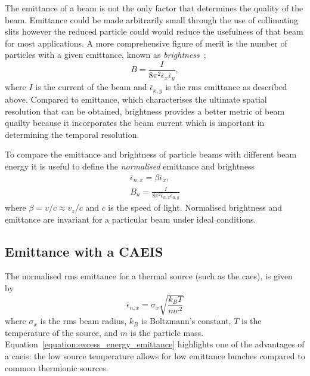 The emittance of a beam is not the only factor that determines the quality of the beam.
Emittance could be made arbitrarily small through the use of collimating slits however the reduced particle could would reduce the usefulness of that beam for most applications.
A more comprehensive figure of merit is the number of particles with a given emittance, known as \emph{brightness}~\cite{reiser_theory_2008};
\begin{equation}
B = \frac{I}{8\pi^2\bar{\epsilon}_x\bar{\epsilon}_y},
\end{equation}
where $I$ is the current of the beam and $\bar{\epsilon}_{x,y}$ is the \gls{rms} emittance as described above.
Compared to emittance, which characterises the ultimate spatial resolution that can be obtained, brightness provides a better metric of beam quailty because it incorporates the beam current which is important in determining the temporal resolution.

To compare the emittance and brightness of particle beams with different beam energy it is useful to define the \emph{normalised} emittance and brightness
\begin{align}
\bar{\epsilon}_{n,x} = \beta\bar{\epsilon}_x,\\
B_n = \frac{I}{8\pi^2\bar{\epsilon}_{n,x}\bar{\epsilon}_{n,y}}
\end{align}
where $\beta=v/c\approx v_z/c$ and $c$ is the speed of light.
Normalised brightness and emittance are invariant for a particular beam under ideal conditions.


\subsection{Emittance with a CAEIS}
\label{section:excess_energy_emittance}

The normalised \gls{rms} emittance for a thermal source (such as the \gls{caes}), is given by~\cite{mcculloch_high-coherence_2013}
\begin{equation}\label{equation:excess_energy_emittance}
\bar{\epsilon}_{n,x} = \sigma_x \sqrt{\frac{k_B T}{m c^2}}
\end{equation}
where $\sigma_x$ is the \gls{rms} beam radius, $k_B$ is Boltzmann's constant, $T$ is the temperature of the source, and $m$ is the particle mass.
Equation~\ref{equation:excess_energy_emittance} highlights one of the advantages of a \gls{caeis}: the low source temperature allows for low emittance bunches compared to common thermionic sources.

